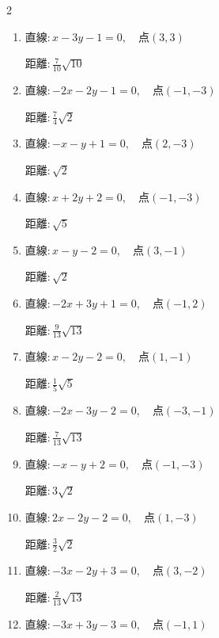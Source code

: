 \begin{multicols}{2}
\begin{enumerate}
        $\displaystyle 距離 : 0$

  \item $直線:x-3y-1=0,\quad 点 ( 3, 3 )$

        $\displaystyle 距離 : \frac{7}{10}\sqrt{10}$

  \item $直線:-2x-2y-1=0,\quad 点 ( -1, -3 )$

        $\displaystyle 距離 : \frac{7}{4}\sqrt{2}$

  \item $直線:-x-y+1=0,\quad 点 ( 2, -3 )$

        $\displaystyle 距離 : \sqrt{2}$

\columnbreak %

\resetques

  \item $直線:x+2y+2=0,\quad 点 ( -1, -3 )$

        $\displaystyle 距離 : \sqrt{5}$

  \item $直線:x-y-2=0,\quad 点 ( 3, -1 )$

        $\displaystyle 距離 : \sqrt{2}$

  \item $直線:-2x+3y+1=0,\quad 点 ( -1, 2 )$

        $\displaystyle 距離 : \frac{9}{13}\sqrt{13}$

  \item $直線:x-2y-2=0,\quad 点 ( 1, -1 )$

        $\displaystyle 距離 : \frac{1}{5}\sqrt{5}$

  \item $直線:-2x-3y-2=0,\quad 点 ( -3, -1 )$

        $\displaystyle 距離 : \frac{7}{13}\sqrt{13}$

  \item $直線:-x-y+2=0,\quad 点 ( -1, -3 )$

        $\displaystyle 距離 : 3\sqrt{2}$

  \item $直線:2x-2y-2=0,\quad 点 ( 1, -3 )$

        $\displaystyle 距離 : \frac{3}{2}\sqrt{2}$

  \item $直線:-3x-2y+3=0,\quad 点 ( 3, -2 )$

        $\displaystyle 距離 : \frac{2}{13}\sqrt{13}$

  \item $直線:-3x+3y-3=0,\quad 点 ( -1, 1 )$


\end{enumerate}
\end{multicols}
